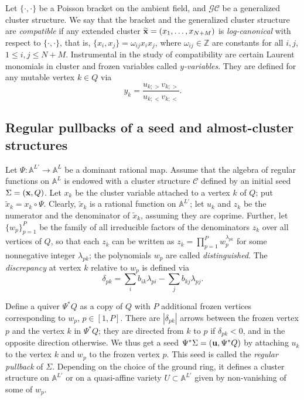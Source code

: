 \documentclass{amsart}
\theoremstyle{definition}
\theoremstyle{remark}
\numberwithin{equation}{section}
\numberwithin{theorem}{section}
\def\AA{{\mathbb A}}
\def\CC{{\mathcal C}}
\def\G{{\mathcal G}}
\def\GCC{{\G\CC}}
\def\Z{{\mathbb Z}}
\def\u{{\bf u}}
\def\x{{\bf x}}
\def\Poi{{\{{\cdot},{\cdot}\}}}
\begin{document}
Let $\Poi$ be a Poisson bracket on the ambient field, and $\GCC$ be a generalized cluster structure. 
We say that the bracket and the generalized cluster structure are {\em compatible\/} if any extended
cluster $\widetilde{\x}=(x_1,\dots,x_{N+M})$ is {\em log-canonical\/} with respect to $\Poi$, that is,
$\{x_i,x_j\}=\omega_{ij} x_ix_j$,
where $\omega_{ij}\in\Z$ are constants for all $i,j$, $1\le i,j\le N+M$. Instrumental in the study of compatibility
are certain Laurent monomials in cluster and frozen variables called {\it $y$-variables\/}. They are defined for any mutable vertex $k\in Q$ via
\begin{equation}\label{yvar}
y_k=\frac{u_{k;>}v_{k;>}}{u_{k;<}v_{k;<}}.
\end{equation}


\subsection{Regular pullbacks of a seed and almost-cluster structures}\label{seedpullback} 
Let %
$\Psi :\AA^{L'}\to \AA^{L}$ be a dominant rational map. Assume that the algebra of regular functions on $\AA^L$ is endowed with a cluster structure $\CC$ defined by an
initial seed $\Sigma=(\x,Q)$. Let $x_k$ be the cluster variable attached to a vertex $k$ of $Q$; put $\tilde x_k=x_k\circ\Psi$. Clearly, $\tilde x_k$ is a rational function on $\AA^{L'}$; let $u_k$ and $z_k$ be the numerator 
and the denominator of $\tilde x_k$, assuming they are coprime. Further, let $\{w_p\}_{p=1}^P$ be the family of all irreducible factors of the denominators $z_k$ over all vertices of $Q$, so that each $z_k$ can be written
as $z_k=\prod_{p=1}^Pw_p^{\lambda_{pk}}$ for some nonnegative integer $\lambda_{pk}$; the polynomials $w_p$ are called
{\it distinguished\/}.
The {\it discrepancy\/} at vertex $k$ 
relative to $w_p$ is defined via
\begin{equation}\label{discrep}
\delta_{pk}=\sum_{i}b_{ik}\lambda_{pi}-\sum_{j}b_{kj}\lambda_{pj}.
\end{equation}

Define a quiver $\Psi^* Q$ as a copy of $Q$ with $P$ additional frozen vertices corresponding to $w_p$, $p\in[1,P]$. There are $|\delta_{pk}|$ arrows between the frozen vertex $p$ and the vertex $k$ in  $\Psi^*Q$; they are directed from $k$ to $p$ if $\delta_{pk}<0$, and in the opposite direction otherwise. 
We thus get a seed $\Psi^*\Sigma=(\u,\Psi^* Q)$ by attaching $u_k$ to the vertex $k$ and $w_p$ to the frozen 
vertex $p$. This seed is called the {\it regular pullback\/} of $\Sigma$. Depending on the choice of the ground ring, 
it defines a cluster structure on $\AA^{L'}$ or on a quasi-affine variety $U\subset \AA^{L'}$ given by non-vanishing of some of $w_p$.
\end{document}
